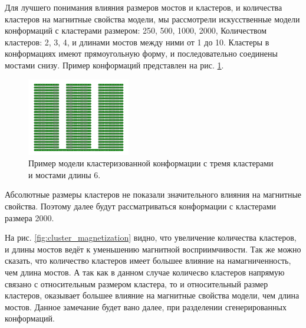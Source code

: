 Для лучшего понимания влияния размеров мостов и кластеров, и количества кластеров на магнитные свойства модели, мы рассмотрели искусственные модели конформаций с кластерами размером: 250, 500, 1000, 2000, Количеством кластеров: 2, 3, 4, и длинами мостов между ними от 1 до 10. Кластеры в конформациях имеют прямоугольную форму, и последовательно соединены мостами снизу. Пример конформаций представлен на рис. \ref{fig:cluster_conf_example}.

\begin{figure}[ht]
	\centering
	\includegraphics*[width=0.4\textwidth]{../images/3Cluster_conformation_short.png}
	\caption{Пример модели кластеризованной конформации с тремя кластерами и мостами длины 6.}
	\label{fig:cluster_conf_example}
\end{figure}

Абсолютные размеры кластеров не показали значительного влияния на магнитные свойства. Поэтому далее будут рассматриваться конформации с кластерами размера 2000.

На рис. \ref{fig:cluster_magnetization} видно, что увеличение количества кластеров, и длины мостов ведёт к уменьшению магнитной восприимчивости. Так же можно сказать, что количество кластеров имеет большее влияние на намагниченность, чем длина мостов. А так как в данном случае количесво кластеров напрямую связано с относительным размером кластера, то и относительный размер кластеров, оказывает большее влияние на магнитные свойства модели, чем длина мостов. Данное замечание будет вано далее, при разделении сгенерированных конформаций.

